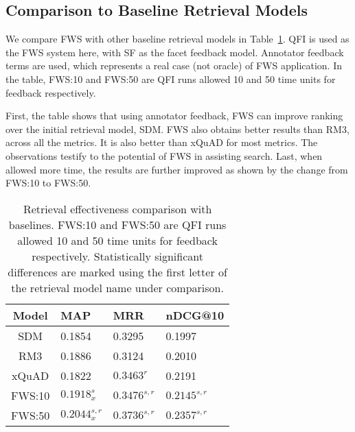 \subsection{Comparison to Baseline Retrieval Models}
\label{sec:ex-rms}
We compare FWS with other baseline retrieval models in Table~\ref{fig:cmp-other}. QFI is used as the FWS system here, with SF as the facet feedback model. Annotator feedback terms are used, which represents a real case (not oracle) of FWS application. 
In the table, FWS:10 and FWS:50 are QFI runs allowed 10 and 50 time units for feedback respectively. 

First, the table shows that using annotator feedback, FWS can improve ranking over the initial retrieval model, SDM. FWS also obtains better results than RM3, across all the metrics. It is also better than xQuAD for most metrics. The observations testify to the potential of FWS in assisting search. Last, when allowed more time, the results are further improved as shown by the change from FWS:10 to FWS:50.

\begin{table}[H]
\centering
\caption{Retrieval effectiveness comparison with baselines. FWS:10 and FWS:50 are QFI runs allowed 10 and 50 time units for feedback respectively. Statistically significant differences are marked using the first letter of the retrieval model name under comparison.}
\label{fig:cmp-other}
\begin{tabular}{|c|l|l|l|} \hline
Model & MAP & MRR & nDCG@10\\ \hline
SDM & 0.1854 & 0.3295 & 0.1997\\ \hline
RM3 & 0.1886 & 0.3124 & 0.2010\\ \hline
xQuAD & 0.1822 & $0.3463^{r}$ & 0.2191\\ \hline
FWS:10 & $0.1918^{s}_{x}$ & $0.3476^{s,r}$ & $0.2145^{s,r}$\\ \hline
FWS:50 & $0.2044^{s,r}_{x}$ & $0.3736^{s,r}$ & $0.2357^{s,r}$\\ \hline 

\end{tabular}
\end{table}

